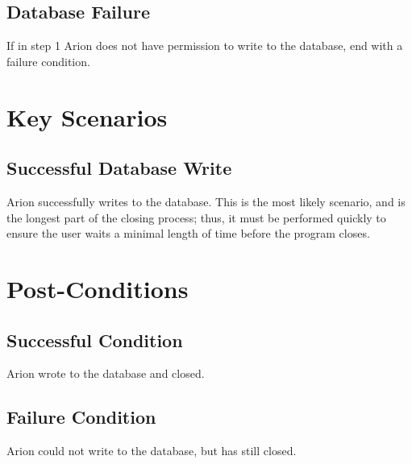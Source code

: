 \documentclass{scrreprt}
\begin{document}
    \subsection{Database Failure}
    If in step 1 Arion does not have permission to write to the database, end with a failure condition.

\section{Key Scenarios}
    \subsection{Successful Database Write}
    Arion successfully writes to the database.
    This is the most likely scenario, and is the longest part of the closing process;
    thus, it must be performed quickly to ensure the user waits a minimal length of time
    before the program closes.


\section{Post-Conditions}
    \subsection{Successful Condition}
    Arion wrote to the database and closed.
    
    \subsection{Failure Condition}
    Arion could not write to the database, but has still closed.
\end{document}
